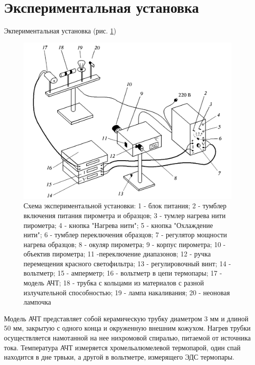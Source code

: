 \documentclass[a4paper]{article}
\begin{document}
\newpage

\section{Экспериментальная установка}

Экпериментальная установка (рис. \ref{setup})

\begin{figure}[H]
    \begin{center}
    \includegraphics[scale = 0.5]{setup.png}
    \caption{Схема экспериментальной установки: 1 - блок питания; 2 - тумблер включения питания пирометра и образцов; 3 - тумлер нагрева нити пирометра; 4 - кнопка "Нагрева нити";
    5 - кнопка "Охлаждение нити"; 6 - тумблер переключения образцов; 7 - регулятор мощности нагрева образцов; 8 - окуляр пирометра; 9 - корпус пирометра; 10 - объектив пирометра; 11 -переключение диапазонов; 12 - ручка перемещения красного светофильтра; 
    13 - регулировочный винт; 14 - вольтметр; 15 - амперметр; 16 - вольтметр в цепи термопары; 17 - модель АЧТ;
    18 - трубка с кольцами из материалов с разной излучательной способностью; 19 - лампа накаливания; 20 - неоновая лампочка}
    \label{setup}
    \end{center}
\end{figure}

Модель АЧТ представляет собой керамическую трубку диаметром 3 мм и длиной 50 мм, закрытую с одного конца и окруженную внешним кожухом.
Нагрев трубки осуществляется намотанной на нее нихромовой спиралью, питаемой от источника тока. 
Температура АЧТ измеряется хромельалюмелевой термопарой, один спай находится в дне трвьки, а другой 
в вольтметре, измерящего ЭДС термопары.\par 
\end{document}

